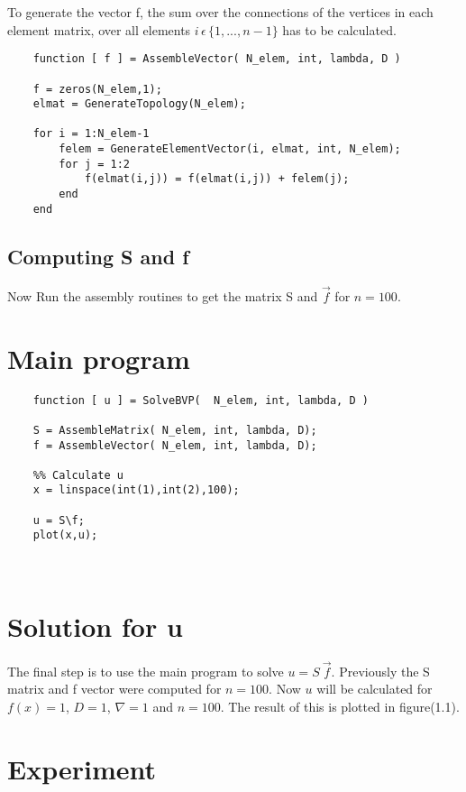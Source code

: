 \documentclass{report}
\begin{document}
\smallskip

To generate the vector f, the sum over the connections of the vertices in each element matrix, over all elements $i\,\epsilon\, \{1,...,n-1\}$  has to be calculated. 

\bigskip

	
\begin{lstlisting}
	function [ f ] = AssembleVector( N_elem, int, lambda, D )
		
	f = zeros(N_elem,1);
	elmat = GenerateTopology(N_elem);
	
	for i = 1:N_elem-1
		felem = GenerateElementVector(i, elmat, int, N_elem);
		for j = 1:2
			f(elmat(i,j)) = f(elmat(i,j)) + felem(j);
		end
	end
\end{lstlisting}	




\subsection{Computing S and f}

Now Run the assembly routines to get the matrix S and $\vec{f}$ for $n = 100$.



\section{Main program}

\begin{lstlisting}
	function [ u ] = SolveBVP(  N_elem, int, lambda, D )
	
	S = AssembleMatrix( N_elem, int, lambda, D);
	f = AssembleVector( N_elem, int, lambda, D);
	
	%% Calculate u
	x = linspace(int(1),int(2),100);
	
	u = S\f;
	plot(x,u); 
	
	
\end{lstlisting}


\section{Solution for u}
The final step is to use the main program to solve $u=S\ \vec{f}$. Previously the S matrix and f vector were computed for $n = 100$. Now $u$ will be calculated for $f(x)=1$, $D=1$, $\nabla = 1$ and $n = 100$. The result of this is plotted in figure(1.1). 


\section{Experiment}
\end{document}
